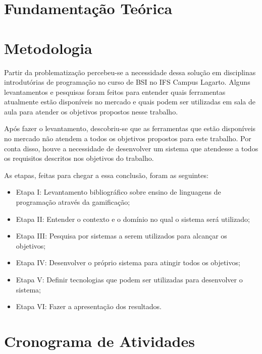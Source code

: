 \documentclass[
	12pt,				%
	oneside,			%
	a4paper,			%
	english,			%
	french,				%
	spanish,			%
	brazil				%
	]{abntex2}
\begin{document}
\hypertarget{fundamentauxe7uxe3o-teuxf3rica}{%
\chapter{Fundamentação Teórica}\label{fundamentauxe7uxe3o-teuxf3rica}}

\hypertarget{metodologia}{%
\chapter{Metodologia}\label{metodologia}}

Partir da problematização percebeu-se a necessidade dessa solução em
disciplinas introdutórias de programação no curso de BSI no IFS Campus
Lagarto. Alguns levantamentos e pesquisas foram feitos para entender
quais ferramentas atualmente estão disponíveis no mercado e quais podem
ser utilizadas em sala de aula para atender os objetivos propostos nesse
trabalho.

Após fazer o levantamento, descobriu-se que as ferramentas que estão
disponíveis no mercado não atendem a todos os objetivos propostos para
este trabalho. Por conta disso, houve a necessidade de desenvolver um
sistema que atendesse a todos os requisitos descritos nos objetivos do
trabalho.

As etapas, feitas para chegar a essa conclusão, foram as seguintes:

\begin{itemize}
\tightlist
\item
  Etapa I: Levantamento bibliográfico sobre ensino de linguagens de
  programação através da gamificação;
\item
  Etapa II: Entender o contexto e o domínio no qual o sistema será
  utilizado;
\item
  Etapa III: Pesquisa por sistemas a serem utilizados para alcançar os
  objetivos;
\item
  Etapa IV: Desenvolver o próprio sistema para atingir todos os
  objetivos;
\item
  Etapa V: Definir tecnologias que podem ser utilizadas para desenvolver
  o sistema;
\item
  Etapa VI: Fazer a apresentação dos resultados.
\end{itemize}

\hypertarget{cronograma-de-atividades}{%
\chapter{Cronograma de Atividades}\label{cronograma-de-atividades}}
\end{document}
